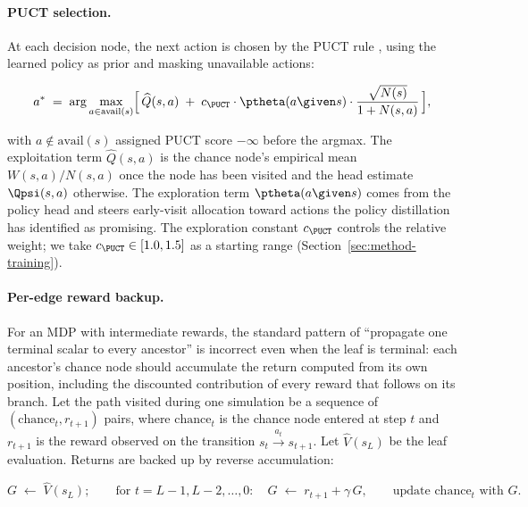\paragraph{PUCT selection.}
At each decision node, the next action is chosen by the PUCT rule
\citep{silver2017alphagozero}, using the learned policy as prior and
masking unavailable actions:

\begin{equation}
\label{eq:puct}
a^{\ast}
\;=\;
\arg\max_{a \in \mathrm{avail}(s)}
\Bigl[\,
\widehat{Q}(s, a)
\;+\;
c_{\PUCT} \cdot \ptheta(a \given s) \cdot \frac{\sqrt{N(s)}}{1 + N(s, a)}
\,\Bigr],
\end{equation}

with $a \notin \mathrm{avail}(s)$ assigned PUCT score $-\infty$ before
the argmax. The exploitation term $\widehat{Q}(s, a)$ is the chance node's
empirical mean $W(s, a) / N(s, a)$ once the node has been visited and the
head estimate $\Qpsi(s, a)$ otherwise. The exploration term
$\ptheta(a \given s)$ comes from the
policy head and steers early-visit allocation toward actions the
policy distillation has identified as promising. The exploration
constant $c_{\PUCT}$ controls the relative weight; we take $c_{\PUCT}
\in [1.0, 1.5]$ as a starting range (Section~\ref{sec:method-training}).

\paragraph{Per-edge reward backup.}
For an MDP with intermediate rewards, the standard pattern of
``propagate one terminal scalar to every ancestor'' is incorrect even
when the leaf is terminal: each ancestor's chance node should accumulate
the return computed from its own position, including the discounted
contribution of every reward that follows on its branch. Let the path
visited during one simulation be a sequence of $(\text{chance}_t,
r_{t+1})$ pairs, where $\text{chance}_t$ is the chance node entered at
step $t$ and $r_{t+1}$ is the reward observed on the transition
$s_t \xrightarrow{a_t} s_{t+1}$. Let $\widehat{V}(s_L)$ be the leaf
evaluation. Returns are backed up by reverse accumulation:

\begin{equation}
\label{eq:backup}
G \;\gets\; \widehat{V}(s_L);
\qquad
\text{for } t = L-1, L-2, \ldots, 0:
\quad
G \;\gets\; r_{t+1} + \gamma\, G,
\qquad
\text{update } \text{chance}_t \text{ with } G.
\end{equation}

